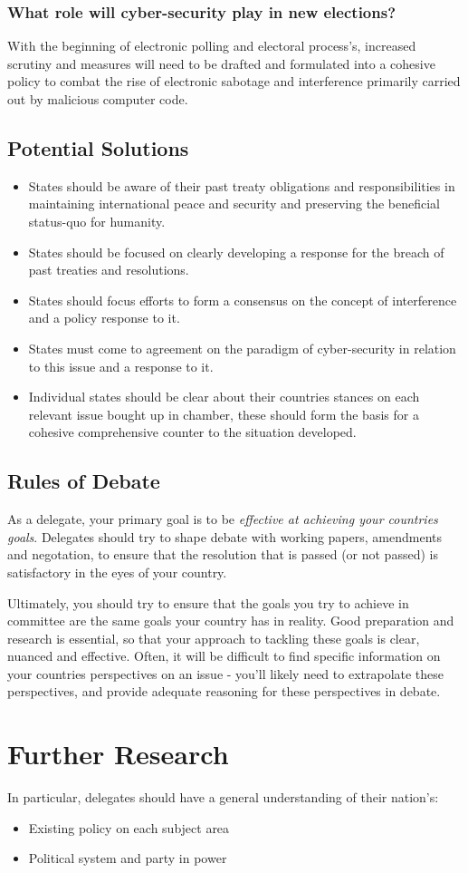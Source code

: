 \documentclass[11pt,a4paper]{report}
\begin{document}
\subsubsection{What role will cyber-security play in new elections?}
With the beginning of electronic polling and electoral process's, increased scrutiny and measures will need to be drafted and formulated into a cohesive policy to combat the rise of electronic sabotage and interference primarily carried out by malicious computer code.

\subsection{Potential Solutions}

\begin{itemize}
	\item States should be aware of their past treaty obligations and responsibilities in maintaining international peace and security and preserving the beneficial status-quo for humanity.
	\item States should be focused on clearly developing a response for the breach of past treaties and resolutions.
	\item States should focus efforts to form a consensus on the concept of interference and a policy response to it.
	\item States must come to agreement on the paradigm of cyber-security in relation to this issue and a response to it.
	\item Individual states should be clear about their countries stances on each relevant issue bought up in chamber, these should form the basis for a cohesive comprehensive counter to the situation developed.
\end{itemize}


\subsection{Rules of Debate}

As a delegate, your primary goal is to be \textit{effective at achieving your countries goals}. Delegates should try to shape debate with working papers, amendments and negotation, to ensure that the resolution that is passed (or not passed) is satisfactory in the eyes of your country.

Ultimately, you should try to ensure that the goals you try to achieve in committee are the same goals your country has in reality. Good preparation and research is essential, so that your approach to tackling these goals is clear, nuanced and effective. Often, it will be difficult to find specific information on your countries perspectives on an issue - you'll likely need to extrapolate these perspectives, and provide adequate reasoning for these perspectives in debate. 

\section{Further Research}

In particular, delegates should have a general understanding of their nation's:

\begin{itemize}
	\item Existing policy on each subject area
	\item Political system and party in power
\end{itemize}
\end{document}
